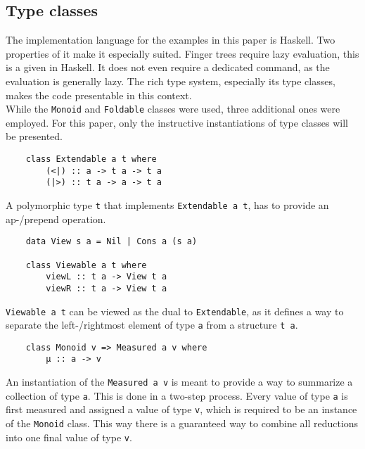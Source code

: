 \subsection{Type classes}

The implementation language for the examples in this paper is Haskell. Two properties of it make it especially suited. Finger trees require lazy evaluation, this is a given in Haskell. It does not even require a dedicated command, as the evaluation is generally lazy.
The rich type system, especially its type classes, makes the code presentable in this context.\\
While the \texttt{Monoid} and \texttt{Foldable} classes were used, three additional ones were employed. For this paper, only the instructive instantiations of type classes will be presented.

\begin{verbatim}
    class Extendable a t where
        (<|) :: a -> t a -> t a 
        (|>) :: t a -> a -> t a
\end{verbatim}

A polymorphic type \texttt{t} that implements \texttt{Extendable a t}, has to provide an ap-/prepend operation.

\begin{verbatim}
    data View s a = Nil | Cons a (s a)

    class Viewable a t where
        viewL :: t a -> View t a
        viewR :: t a -> View t a
\end{verbatim}

\texttt{Viewable a t} can be viewed as the dual to \texttt{Extendable}, as it defines a way to separate the left-/rightmost element of type \texttt{a} from a structure \texttt{t a}.

\begin{verbatim}
    class Monoid v => Measured a v where
        μ :: a -> v
\end{verbatim}

An instantiation of the \texttt{Measured a v} is meant to provide a way to summarize a collection of type \texttt{a}. This is done in a two-step process. Every value of type \texttt{a} is first measured and assigned a value of type \texttt{v}, which is required to be an instance of the \texttt{Monoid} class. This way there is a guaranteed way to combine all reductions into one final value of type \texttt{v}.

